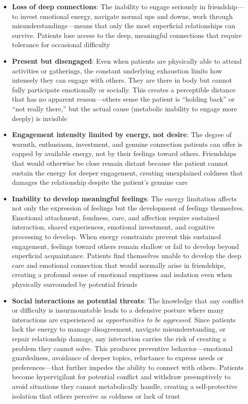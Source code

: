 \begin{itemize}
    \item \textbf{Loss of deep connections}: The inability to engage seriously in friendship---to invest emotional energy, navigate normal ups and downs, work through misunderstandings---means that only the most superficial relationships can survive. Patients lose access to the deep, meaningful connections that require tolerance for occasional difficulty

    \item \textbf{Present but disengaged}: Even when patients are physically able to attend activities or gatherings, the constant underlying exhaustion limits how intensely they can engage with others. They are there in body but cannot fully participate emotionally or socially. This creates a perceptible distance that has no apparent reason---others sense the patient is ``holding back'' or ``not really there,'' but the actual cause (metabolic inability to engage more deeply) is invisible

    \item \textbf{Engagement intensity limited by energy, not desire}: The degree of warmth, enthusiasm, investment, and genuine connection patients can offer is capped by available energy, not by their feelings toward others. Friendships that would otherwise be close remain distant because the patient cannot sustain the energy for deeper engagement, creating unexplained coldness that damages the relationship despite the patient's genuine care

    \item \textbf{Inability to develop meaningful feelings}: The energy limitation affects not only the expression of feelings but the development of feelings themselves. Emotional attachment, fondness, care, and affection require sustained interaction, shared experiences, emotional investment, and cognitive processing to develop. When energy constraints prevent this sustained engagement, feelings toward others remain shallow or fail to develop beyond superficial acquaintance. Patients find themselves unable to develop the deep care and emotional connection that would normally arise in friendships, creating a profound sense of emotional emptiness and isolation even when physically surrounded by potential friends

    \item \textbf{Social interactions as potential threats}: The knowledge that any conflict or difficulty is insurmountable leads to a defensive posture where many interactions are experienced as \textit{opportunities to be aggressed}. Since patients lack the energy to manage disagreement, navigate misunderstanding, or repair relationship damage, any interaction carries the risk of creating a problem they cannot solve. This produces preventive behavior---emotional guardedness, avoidance of deeper topics, reluctance to express needs or preferences---that further impedes the ability to connect with others. Patients become hypervigilant for potential conflict and withdraw preemptively to avoid situations they cannot metabolically handle, creating a self-protective isolation that others perceive as coldness or lack of trust
\end{itemize}

